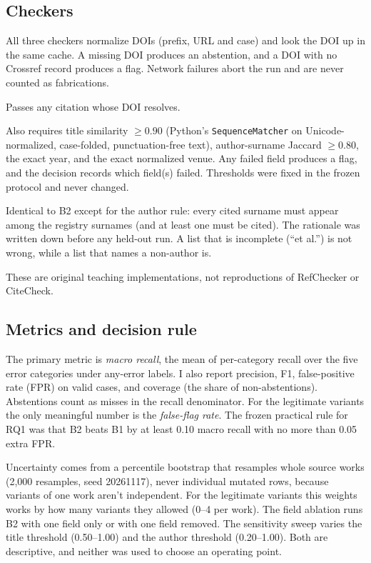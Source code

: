 \documentclass[acmsmall,screen,nonacm]{acmart}
\newcommand{\BOne}{B1}
\newcommand{\BTwo}{B2}
\newcommand{\BThree}{B3}
\begin{document}
\subsection{Checkers}
All three checkers normalize DOIs (prefix, URL and case) and look the DOI up in the same cache. A missing DOI produces an abstention, and a DOI with no Crossref record produces a flag. Network failures abort the run and are never counted as fabrications.
\begin{description}[leftmargin=1.2em,itemsep=1pt]
\item[\BOne{} DOI-only.] Passes any citation whose DOI resolves.
\item[\BTwo{} field matching.] Also requires title similarity $\geq 0.90$ (Python's \texttt{SequenceMatcher} on Unicode-normalized, case-folded, punctuation-free text), author-surname Jaccard $\geq 0.80$, the exact year, and the exact normalized venue. Any failed field produces a flag, and the decision records which field(s) failed. Thresholds were fixed in the frozen protocol and never changed.
\item[\BThree{} containment.] Identical to \BTwo{} except for the author rule: every cited surname must appear among the registry surnames (and at least one must be cited). The rationale was written down before any held-out run. A list that is incomplete (``et al.'') is not wrong, while a list that names a non-author is.
\end{description}
These are original teaching implementations, not reproductions of RefChecker or CiteCheck.

\subsection{Metrics and decision rule}
The primary metric is \emph{macro recall}, the mean of per-category recall over the five error categories under any-error labels. I also report precision, F1, false-positive rate (FPR) on valid cases, and coverage (the share of non-abstentions). Abstentions count as misses in the recall denominator. For the legitimate variants the only meaningful number is the \emph{false-flag rate}. The frozen practical rule for RQ1 was that \BTwo{} beats \BOne{} by at least 0.10 macro recall with no more than 0.05 extra FPR.

Uncertainty comes from a percentile bootstrap that resamples whole source works (2{,}000 resamples, seed 20261117), never individual mutated rows, because variants of one work aren't independent. For the legitimate variants this weights works by how many variants they allowed (0--4 per work). The field ablation runs \BTwo{} with one field only or with one field removed. The sensitivity sweep varies the title threshold (0.50--1.00) and the author threshold (0.20--1.00). Both are descriptive, and neither was used to choose an operating point.
\end{document}
